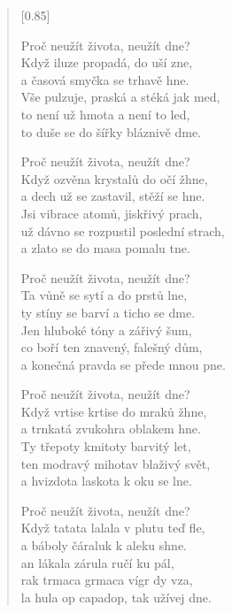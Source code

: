 \documentclass[12pt, a4paper]{article}
\begin{document}
\begin{verse}[0.85\textwidth]
\vspace{1em}
\newpage

Proč neužít života, neužít dne? \\
Když iluze propadá, do uší zne, \\
a časová smyčka se trhavě hne. \\
Vše pulzuje, praská a stéká jak med, \\
to není už hmota a není to led, \\
to duše se do šířky bláznivě dme.

\vspace{0.5em}

Proč neužít života, neužít dne? \\
Když ozvěna krystalů do očí žhne, \\
a dech už se zastavil, stěží se hne. \\
Jsi vibrace atomů, jiskřivý prach, \\
už dávno se rozpustil poslední strach, \\
a zlato se do masa pomalu tne.

\vspace{0.5em}

Proč neužít života, neužít dne? \\
Ta vůně se sytí a do prstů lne, \\
ty stíny se barví a ticho se dme. \\
Jen hluboké tóny a zářivý šum, \\
co boří ten znavený, falešný dům, \\
a konečná pravda se přede mnou pne.

\vspace{0.5em}

Proč neužít života, neužít dne? \\
Když vrtise krtise do mraků žhne, \\
a trnkatá zvukohra oblakem hne. \\
Ty třepoty kmitoty barvitý let, \\
ten modravý mihotav blaživý svět, \\
a hvizdota laskota k oku se lne.

\vspace{0.5em}

Proč neužít života, neužít dne? \\
Když tatata lalala v plutu teď fle, \\
a báboly čáraluk k aleku shne. \\
an lákala zárula ručí ku pál, \\
rak trmaca grmaca vígr dy vza, \\
la hula op capadop, tak užívej dne.

\end{verse}
\end{document}
